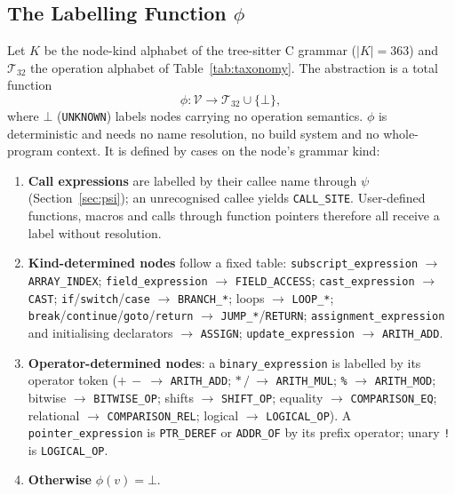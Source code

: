 \subsection{The Labelling Function $\phi$}
\label{sec:phi}

Let $K$ be the node-kind alphabet of the tree-sitter C grammar ($|K| = 363$)
and $\mathcal{T}_{32}$ the operation alphabet of Table~\ref{tab:taxonomy}. The
abstraction is a total function
\begin{equation}
    \phi : \mathcal{V} \longrightarrow \mathcal{T}_{32} \cup \{\bot\},
\label{eq:phi}
\end{equation}
where $\bot$ (\texttt{UNKNOWN}) labels nodes carrying no operation semantics.
$\phi$ is deterministic and needs no name resolution, no build system and no
whole-program context. It is defined by cases on the node's grammar kind:

\begin{enumerate}
    \item \textbf{Call expressions} are labelled by their callee name through
          $\psi$ (Section~\ref{sec:psi}); an unrecognised callee yields
          \texttt{CALL\_SITE}. User-defined functions, macros and calls
          through function pointers therefore all receive a label without
          resolution.
    \item \textbf{Kind-determined nodes} follow a fixed table:
          \texttt{subscript\_expression} $\to$ \texttt{ARRAY\_INDEX};
          \texttt{field\_expression} $\to$ \texttt{FIELD\_ACCESS};
          \texttt{cast\_expression} $\to$ \texttt{CAST};
          \texttt{if}/\texttt{switch}/\texttt{case} $\to$ \texttt{BRANCH\_*};
          loops $\to$ \texttt{LOOP\_*};
          \texttt{break}/\texttt{continue}/\texttt{goto}/\texttt{return} $\to$
          \texttt{JUMP\_*}/\texttt{RETURN};
          \texttt{assignment\_expression} and initialising declarators $\to$
          \texttt{ASSIGN}; \texttt{update\_expression} $\to$
          \texttt{ARITH\_ADD}.
    \item \textbf{Operator-determined nodes}: a \texttt{binary\_expression} is
          labelled by its operator token ($+\,-\ \to$ \texttt{ARITH\_ADD};
          $*\,/\ \to$ \texttt{ARITH\_MUL}; \texttt{\%} $\to$
          \texttt{ARITH\_MOD}; bitwise $\to$ \texttt{BITWISE\_OP}; shifts
          $\to$ \texttt{SHIFT\_OP}; equality $\to$ \texttt{COMPARISON\_EQ};
          relational $\to$ \texttt{COMPARISON\_REL}; logical $\to$
          \texttt{LOGICAL\_OP}). A \texttt{pointer\_expression} is
          \texttt{PTR\_DEREF} or \texttt{ADDR\_OF} by its prefix operator;
          unary \texttt{!} is \texttt{LOGICAL\_OP}.
    \item \textbf{Otherwise} $\phi(v) = \bot$.
\end{enumerate}

